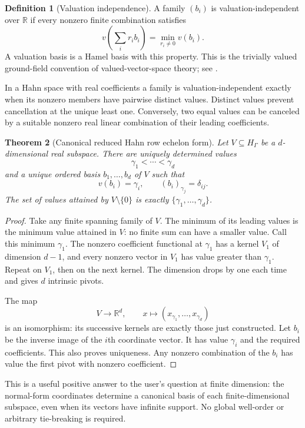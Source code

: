 \documentclass[11pt,letterpaper]{article}
\numberwithin{equation}{section}
\newtheorem{theorem}{Theorem}[section]
\theoremstyle{definition}
\newtheorem{definition}[theorem]{Definition}
\theoremstyle{remark}
\newcommand{\R}{\mathbb{R}}
\begin{document}
\begin{definition}[Valuation independence]
A family $(b_i)$ is valuation-independent over $\R$ if every nonzero finite combination satisfies
\[
 v\left(\sum_i r_i b_i\right)=\min_{r_i\ne0}v(b_i).
\]
A valuation basis is a Hamel basis with this property. This is the trivially valued ground-field convention of valued-vector-space theory; see \cite{Kuhlmann}.
\end{definition}
In a Hahn space with real coefficients a family is valuation-independent exactly when its nonzero members have pairwise distinct values. Distinct values prevent cancellation at the unique least one. Conversely, two equal values can be canceled by a suitable nonzero real linear combination of their leading coefficients.

\begin{theorem}[Canonical reduced Hahn row echelon form]\label{rvs:eu:thm:echelon}
Let $V\subseteq H_\Gamma$ be a $d$-dimensional real subspace. There are uniquely determined values
\[
 \gamma_1<\cdots<\gamma_d
\]
and a unique ordered basis $b_1,\ldots,b_d$ of $V$ such that
\[
 v(b_i)=\gamma_i,\qquad (b_i)_{\gamma_j}=\delta_{ij}.
\]
The set of values attained by $V\setminus\{0\}$ is exactly $\{\gamma_1,\ldots,\gamma_d\}$.
\end{theorem}
\begin{proof}
Take any finite spanning family of $V$. The minimum of its leading values is the minimum value attained in $V$: no finite sum can have a smaller value. Call this minimum $\gamma_1$. The nonzero coefficient functional at $\gamma_1$ has a kernel $V_1$ of dimension $d-1$, and every nonzero vector in $V_1$ has value greater than $\gamma_1$. Repeat on $V_1$, then on the next kernel. The dimension drops by one each time and gives $d$ intrinsic pivots.

The map
\[
 V\longrightarrow\R^d,\qquad x\longmapsto(x_{\gamma_1},\ldots,x_{\gamma_d})
\]
is an isomorphism: its successive kernels are exactly those just constructed. Let $b_i$ be the inverse image of the $i$th coordinate vector. It has value $\gamma_i$ and the required coefficients. This also proves uniqueness. Any nonzero combination of the $b_i$ has value the first pivot with nonzero coefficient.
\end{proof}
This is a useful positive answer to the user's question at finite dimension: the normal-form coordinates determine a canonical basis of each finite-dimensional subspace, even when its vectors have infinite support. No global well-order or arbitrary tie-breaking is required.
\end{document}
